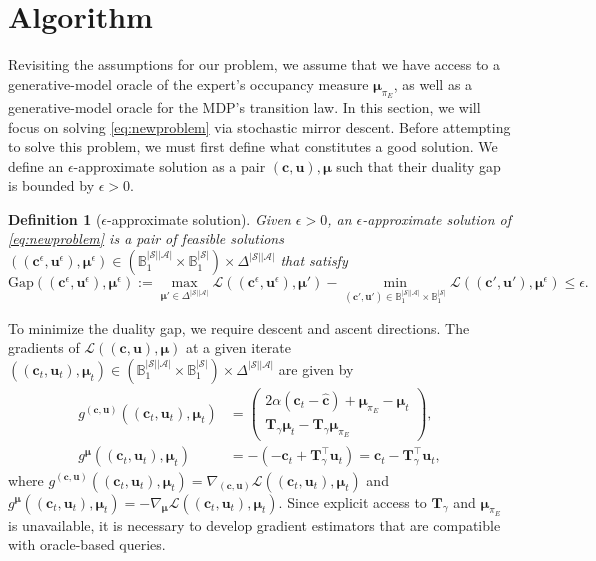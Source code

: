 \documentclass[10pt]{article} %
\newtheorem{definition}{Definition}
\def\Ac{\ensuremath{\mathcal{A}}}
\def\mTg{{\bm{T}}_\gamma}
\def\vc{{\bm{c}}}
\def\vu{{\bm{u}}}
\def\vmu{{\bm{\mu}}}
\def\sB{{\mathbb{B}}}
\newcommand{\St}{\mathcal{S}}
\begin{document}
\section{Algorithm}

Revisiting the assumptions for our problem, we assume that we have access to a generative-model oracle of the expert's occupancy measure $\vmu_{\pi_E}$, as well as a generative-model oracle for the MDP's transition law. In this section, we will focus on solving \eqref{eq:newproblem} via stochastic mirror descent. Before attempting to solve this problem, we must first define what constitutes a good solution. We define an $\epsilon$-approximate solution as a pair  $(\vc,\vu), \vmu$ such that their duality gap is bounded by $\epsilon >0$.
\begin{definition}[$\epsilon$-approximate solution]
    Given $\epsilon>0$, an $\epsilon$-approximate solution of   \eqref{eq:newproblem} is a pair of feasible solutions $((\vc^\epsilon, \vu^\epsilon), \vmu^\epsilon) \in \left(\sB^{|\St||\Ac|}_{1}\times \sB^{|\St|}_{1}\right) \times \Delta^{|\St||\Ac|}$ that satisfy 
$$\text{Gap}((\vc^\epsilon, \vu^\epsilon), \vmu^\epsilon) := \max_{\vmu'\in\Delta^{|\St||\Ac|}}\mathcal{L}((\vc^\epsilon,\vu^\epsilon),\vmu') - \min_{(\vc',\vu')\in \sB^{|\St||\Ac|}_{1}\times \sB^{|\St|}_{1}}\mathcal{L}((\vc',\vu'),\vmu^\epsilon) \leq \epsilon.$$
\end{definition}

To minimize the duality gap, we require descent and ascent directions. The gradients of $\mathcal{L}((\vc, \vu), \vmu)$ at a given iterate $((\vc_t, \vu_t), \vmu_t) \in ( \sB^{|\St||\Ac|}_{1}\times \sB^{|\St|}_{1} ) \times \Delta^{|\St||\Ac|}$ are given by
\begin{align*}
    g^{(\vc,\vu)}((\vc_t,\vu_t),\vmu_t) &= \begin{pmatrix}
2\alpha(\vc_t-\hat{\vc}) + \vmu_{\pi_E} - \vmu_t \\
\mTg\vmu_t - \mTg\vmu_{\pi_E}
\end{pmatrix},\\
    g^{\vmu}((\vc_t,\vu_t),\vmu_t) &= -(- \vc_t + \mTg^\top \vu_t) = \vc_t - \mTg^\top \vu_t,
\end{align*}
where $g^{(\vc,\vu)}((\vc_t,\vu_t),\vmu_t) = \nabla_{(\vc,\vu)}\mathcal{L}((\vc_t, \vu_t), \vmu_t)$ and $g^{\vmu}((\vc_t,\vu_t),\vmu_t) = -\nabla_{\vmu}\mathcal{L}((\vc_t, \vu_t), \vmu_t)$. Since explicit access to $\mTg$ and $\vmu_{\pi_E}$ is unavailable, it is necessary to develop gradient estimators that are compatible with oracle-based queries.
\end{document}
